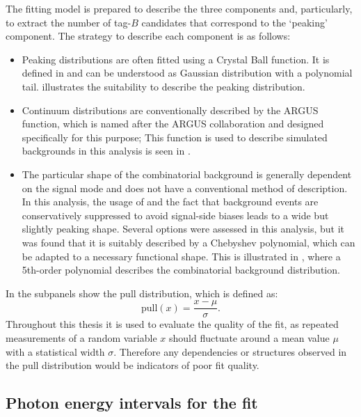 The fitting model is prepared to describe the three components and, particularly, to extract the number of tag-$B$ candidates that correspond to the `peaking' component.
The strategy to describe each component is as follows:
\begin{itemize}
    \item Peaking \Mbc distributions are often fitted using a Crystal Ball function.
    It is defined in  and can be understood as Gaussian distribution with a polynomial tail.
     illustrates the suitability to describe the peaking \Mbc distribution.
    \item Continuum \Mbc distributions are conventionally described by the ARGUS function, which is named after the ARGUS collaboration and designed specifically for this purpose;
    This function is used to describe \epem\ra\qqbar simulated backgrounds in this analysis is seen in .
    \item The particular shape of the combinatorial \BB background is generally dependent on the signal mode and does not have a conventional method of description.
    In this analysis, the usage of \FEI and the fact that background events are conservatively suppressed to avoid signal-side biases leads to a wide but slightly peaking shape.
    Several options were assessed in this analysis, but it was found that it is suitably described by a Chebyshev polynomial, which can be adapted to a necessary functional shape.
    This is illustrated in , where a 5th-order polynomial describes the combinatorial \BB background distribution.
\end{itemize}
In  the subpanels show the pull distribution, which is defined as:
\begin{equation}\label{eq:pull_distribution}
    \mathrm{pull}(x) = \frac{x-\mu}{\sigma}. 
\end{equation}
Throughout this thesis it is used to evaluate the quality of the fit, as repeated measurements of a random variable $x$ should fluctuate around a mean value $\mu$ with a statistical width $\sigma$.
Therefore any dependencies or structures observed in the pull distribution would be indicators of poor fit quality. 

\subsection{Photon energy intervals for the fit}\label{sec:binning}

